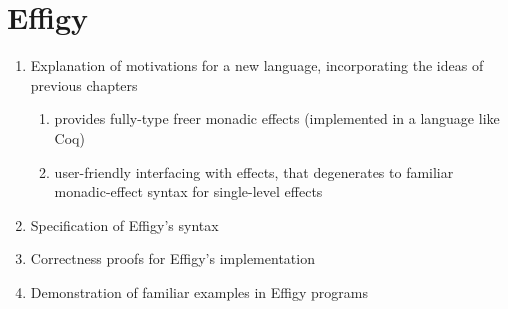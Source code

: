 \chapter{Effigy}

\begin{enumerate}
  \item Explanation of motivations for a new language, incorporating the ideas of previous chapters
  \begin{enumerate}
    \item provides fully-type freer monadic effects (implemented in a language like Coq)
    \item user-friendly interfacing with effects, that degenerates to familiar monadic-effect syntax for single-level effects
  \end{enumerate}
  \item Specification of Effigy's syntax
  \item Correctness proofs for Effigy's implementation
  \item Demonstration of familiar examples in Effigy programs
\end{enumerate}
